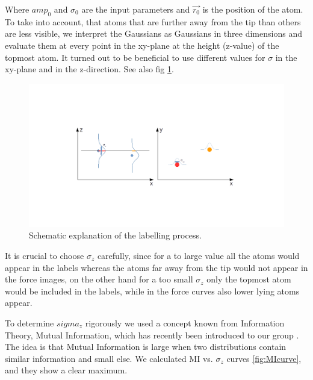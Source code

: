 \documentclass{article}
\begin{document}
Where $amp_0$ and $\sigma_0$ are the input parameters and $\vec{r_0}$ is the position of the atom. To take into account, that atoms that are further away from the tip than others are less visible, we interpret the Gaussians as Gaussians in three dimensions and evaluate them at every point in the xy-plane at the height (z-value) of the topmost atom. It turned out to be beneficial to use different values for $\sigma$ in the xy-plane and in the z-direction. See also fig \ref{fig:gaussians}.

 \begin{figure}[htbp]
 	\begin{center}
 		\includegraphics[width=12cm]{figs/gaussians.png}
 		\caption{Schematic explanation of the labelling process.}
 		\label{fig:gaussians}
 	\end{center}
 \end{figure}

It is crucial to choose $\sigma_z$ carefully, since for a to large value all the atoms would appear in the labels whereas the atoms far away from the tip would not appear in the force images, on the other hand for a too small $\sigma_z$ only the topmost atom would be included in the labels, while in the force curves also lower lying atoms appear.

To determine $sigma_z$ rigorously we used a concept known from Information Theory, Mutual Information, which has recently been introduced to our group \cite{MIestimator}. The idea is that Mutual Information is large when two distributions contain similar information and small else. We calculated MI vs. $\sigma_z$ curves \ref{fig:MIcurve}, and they show a clear maximum.
\end{document}
